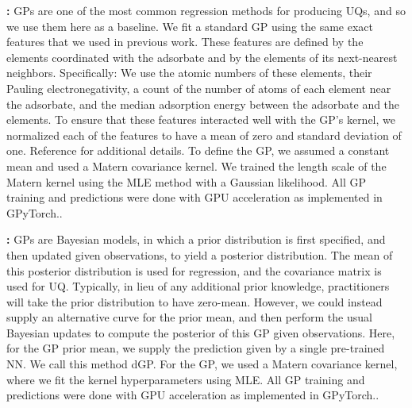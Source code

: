 \documentclass[]{achemso}
\begin{document}
\textbf{:}
\gls{GP}s are one of the most common regression methods for producing \gls{UQ}s, and so we use them here as a baseline.
We fit a standard \gls{GP} using the same exact features that we used in previous work.\cite{Tran2018}
These features are defined by the elements coordinated with the adsorbate and by the elements of its next-nearest neighbors.
Specifically:  We use the atomic numbers of these elements, their Pauling electronegativity, a count of the number of atoms of each element near the adsorbate, and the median adsorption energy between the adsorbate and the elements.
To ensure that these features interacted well with the \gls{GP}'s kernel, we normalized each of the features to have a mean of zero and standard deviation of one.
Reference \citet{Tran2018} for additional details.
To define the \gls{GP}, we assumed a constant mean and used a Matern covariance kernel.
We trained the length scale of the Matern kernel using the \gls{MLE} method with a Gaussian likelihood.
All \gls{GP} training and predictions were done with GPU acceleration as implemented in GPyTorch.\cite{Gardner2018}.

\textbf{:}
\gls{GP}s are Bayesian models, in which a prior distribution is first specified, and then updated given observations, to yield a posterior distribution. 
The mean of this posterior distribution is used for regression, and the covariance matrix is used for \gls{UQ}. 
Typically, in lieu of any additional prior knowledge, practitioners will take the prior distribution to have zero-mean. 
However, we could instead supply an alternative curve for the prior mean, and then perform the usual Bayesian updates to compute the posterior of this \gls{GP} given observations. 
Here, for the \gls{GP} prior mean, we supply the prediction given by a single pre-trained \gls{NN}. 
We call this method \gls{dGP}.
For the \gls{GP}, we used a Matern covariance kernel, where we fit the kernel hyperparameters using \gls{MLE}. 
All \gls{GP} training and predictions were done with GPU acceleration as implemented in GPyTorch.\cite{Gardner2018}.
\end{document}
